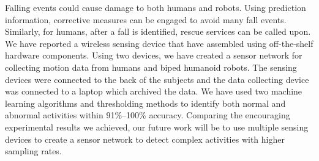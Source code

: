 \documentclass{IEEEtran}
\begin{document}
Falling events could cause damage to both humans and robots.  Using prediction information, 
corrective measures can be engaged to avoid 
 many fall events. Similarly, for humans, after  a fall is identified, rescue services 
 can be called upon. We have reported a wireless sensing device that have assembled using 
off-the-shelf hardware components. Using two devices, we have created a sensor network for 
collecting motion data from humans and biped humanoid robots. The sensing devices were connected to 
the back of the subjects and the data collecting device was connected to a laptop which archived 
the data. We have used two machine learning algorithms and thresholding methods to 
identify both normal and abnormal activities within 91\%--100\% accuracy. Comparing the encouraging 
experimental results we achieved, our future work will be to use multiple sensing devices to create 
a sensor network to detect complex activities with higher sampling rates.  




\end{document}

